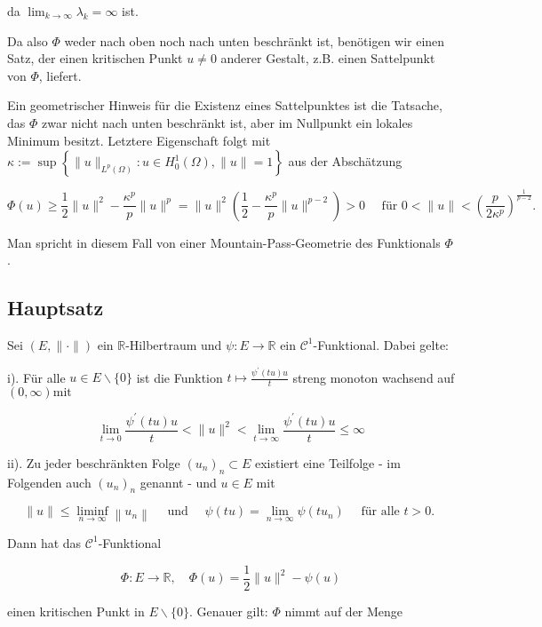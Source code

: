 \documentclass[10pt, letterpaper]{article}
\begin{document}
da $\lim _{k \rightarrow \infty} \lambda_{k}=\infty$ ist.

Da also $\Phi$ weder nach oben noch nach unten beschränkt ist, benötigen wir einen Satz, der einen kritischen Punkt $u \neq 0$ anderer Gestalt, z.B. einen Sattelpunkt von $\Phi$, liefert.

Ein geometrischer Hinweis für die Existenz eines Sattelpunktes ist die Tatsache, das $\Phi$ zwar nicht nach unten beschränkt ist, aber im Nullpunkt ein lokales Minimum besitzt. Letztere Eigenschaft folgt mit $\kappa:=\sup \left\{\|u\|_{L^{p}(\Omega)}: u \in H_{0}^{1}(\Omega),\|u\|=1\right\}$ aus der Abschätzung

$$
\Phi(u) \geq \frac{1}{2}\|u\|^{2}-\frac{\kappa^{p}}{p}\|u\|^{p}=\|u\|^{2}\left(\frac{1}{2}-\frac{\kappa^{p}}{p}\|u\|^{p-2}\right)>0 \quad \text { für } 0<\|u\|<\left(\frac{p}{2 \kappa^{p}}\right)^{\frac{1}{p-2}} \text {. }
$$

Man spricht in diesem Fall von einer Mountain-Pass-Geometrie des Funktionals $\Phi$.

\subsection*{Hauptsatz}

Sei $(E,\|\cdot\|)$ ein $\mathbb{R}$-Hilbertraum und $\psi: E \rightarrow \mathbb{R}$ ein $\mathcal{C}^{1}$-Funktional. Dabei gelte:

i). Für alle $u \in E \backslash\{0\}$ ist die Funktion $t \mapsto \frac{\psi^{\prime}(t u) u}{t}$ streng monoton wachsend auf $(0, \infty) \mathrm{mit}$

$$
\lim _{t \rightarrow 0} \frac{\psi^{\prime}(t u) u}{t}<\|u\|^{2}<\lim _{t \rightarrow \infty} \frac{\psi^{\prime}(t u) u}{t} \leq \infty
$$

ii). Zu jeder beschränkten Folge $\left(u_{n}\right)_{n} \subset E$ existiert eine Teilfolge - im Folgenden auch $\left(u_{n}\right)_{n}$ genannt - und $u \in E$ mit

$$
\|u\| \leq \liminf _{n \rightarrow \infty}\left\|u_{n}\right\| \quad \text { und } \quad \psi(t u)=\lim _{n \rightarrow \infty} \psi\left(t u_{n}\right) \quad \text { für alle } t>0 \text {. }
$$

Dann hat das $\mathcal{C}^{1}$-Funktional

$$
\Phi: E \rightarrow \mathbb{R}, \quad \Phi(u)=\frac{1}{2}\|u\|^{2}-\psi(u)
$$

einen kritischen Punkt in $E \backslash\{0\}$. Genauer gilt: $\Phi$ nimmt auf der Menge
\end{document}
